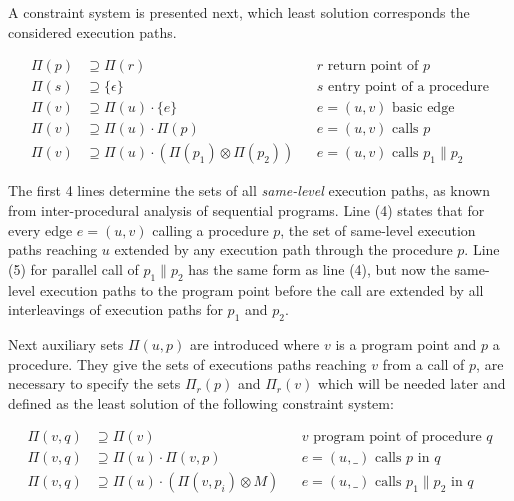 \documentclass[article]{uibk}
\begin{document}
A constraint system is presented next, which least solution corresponds the
considered execution paths.


\begin{align}
    \Pi(p) &\supseteq \Pi(r)                                   && \text{$r$ return point of $p$} \\
    \Pi(s) &\supseteq \{\epsilon\}                             && \text{$s$ entry point of a procedure} \\
    \Pi(v) &\supseteq \Pi(u) \cdot \{e\}                       && \text{$e = (u,v)$ basic edge} \\
    \Pi(v) &\supseteq \Pi(u) \cdot \Pi(p)                      && \text{$e = (u,v)$ calls $p$} \\
    \Pi(v) &\supseteq \Pi(u) \cdot (\Pi(p_1) \otimes \Pi(p_2)) && \text{$e = (u,v)$ calls $p_1 \parallel p_2$}
\end{align}

The first 4 lines determine the sets of all \textit{same-level} execution
paths, as known from inter-procedural analysis of sequential programs.
Line (4) states that for every edge $e = (u,v)$ calling a procedure $p$, the
set of same-level execution paths reaching $u$ extended by any execution path
through the procedure $p$. Line (5) for parallel call of $p_1 \parallel p_2$
has the same form as line (4), but now the same-level execution paths to the
program point before the call are extended by all interleavings of execution
paths for $p_1$ and $p_2$.

Next auxiliary sets $\Pi(u,p)$ are introduced where $v$ is a program point and
$p$ a procedure. They give the sets of executions paths reaching $v$ from a
call of $p$, are necessary to specify the sets $\Pi_r(p)$ and $\Pi_r(v)$ which
will be needed later and defined as the least solution of the following
constraint system:

\begin{align}
    \Pi(v,q) &\supseteq \Pi(v)                               && \text{$v$ program point of procedure $q$} \\
    \Pi(v,q) &\supseteq \Pi(u) \cdot \Pi(v,p)                && \text{$e = (u,\_)$ calls $p$ in $q$} \\
    \Pi(v,q) &\supseteq \Pi(u) \cdot (\Pi(v, p_i) \otimes M) && \text{$e = (u,\_)$ calls $p_1 \parallel p_2$ in $q$}
\end{align}
\end{document}
